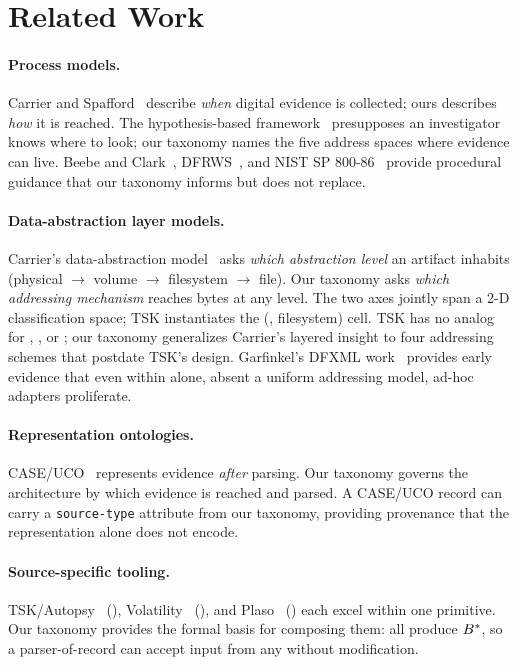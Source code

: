 \section{Related Work}
\label{sec:related}

\paragraph{Process models.}
Carrier and Spafford~\cite{carrier2003getting} describe \emph{when} digital
evidence is collected; ours describes \emph{how} it is reached. The
hypothesis-based framework~\cite{carrier2006hypothesis} presupposes an
investigator knows where to look; our taxonomy names the five address spaces
where evidence can live. Beebe and Clark~\cite{beebe2005hierarchical},
DFRWS~\cite{palmer2001roadmap}, and NIST SP 800-86~\cite{kent2006sp80086}
provide procedural guidance that our taxonomy informs but does not replace.

\paragraph{Data-abstraction layer models.}
Carrier's data-abstraction model~\cite{carrier2005file} asks \emph{which
abstraction level} an artifact inhabits (physical $\to$ volume $\to$
filesystem $\to$ file). Our taxonomy asks \emph{which addressing mechanism}
reaches bytes at any level. The two axes jointly span a 2-D classification
space; TSK instantiates the (, filesystem) cell. TSK has no
analog for , , or ; our taxonomy generalizes
Carrier's layered insight to four addressing schemes that postdate TSK's
design. Garfinkel's DFXML work~\cite{garfinkel2009automating} provides
early evidence that even within  alone, absent a uniform addressing
model, ad-hoc adapters proliferate.

\paragraph{Representation ontologies.}
CASE/UCO~\cite{caseuco2018,casey2017advancing} represents evidence
\emph{after} parsing. Our taxonomy governs the architecture by which
evidence is reached and parsed. A CASE/UCO record can carry a
\texttt{source-type} attribute from our taxonomy, providing provenance that
the representation alone does not encode.

\paragraph{Source-specific tooling.}
TSK/Autopsy~\cite{carrier2005file} (), Volatility~\cite{ligh2014artmemory}
(), and Plaso~\cite{plaso} () each excel within one primitive.
Our taxonomy provides the formal basis for composing them: all produce
$B^{*}$, so a parser-of-record can accept input from any without
modification.

